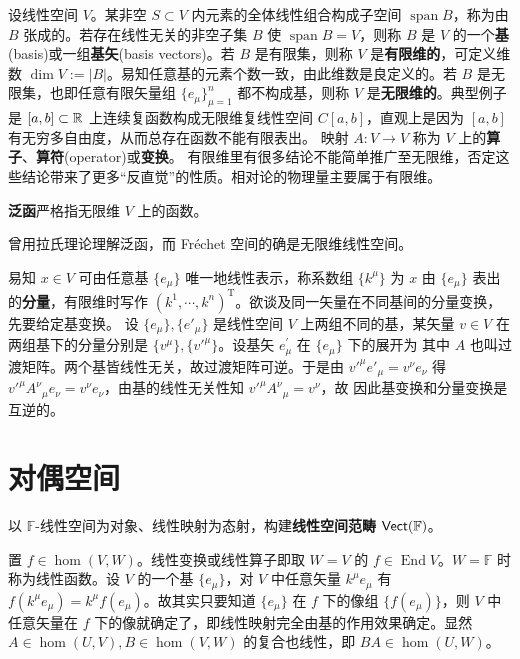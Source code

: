 设线性空间 $V$。某非空 $S\subset V$ 内元素的全体线性组合构成子空间 $\operatorname{span}B$，称为由 $B$ 张成的。若存在线性无关的非空子集 $B$ 使 $\operatorname{span}B=V$，则称 $B$ 是 $V$ 的一个\textbf{基}(basis)或一组\textbf{基矢}(basis vectors)。若 $B$ 是有限集，则称 $V$ 是\textbf{有限维的}，可定义维数 $\dim V:=|B|$。易知任意基的元素个数一致，由此维数是良定义的。若 $B$ 是无限集，也即任意有限矢量组 $\{e_\mu\}_{\mu=1}^n$ 都不构成基，则称 $V$ 是\textbf{无限维的}。典型例子是 $[a, b] \subset \mathbb{R}$ 上连续复函数构成无限维复线性空间 $C[a, b]$，直观上是因为 $[a, b]$ 有无穷多自由度，从而总存在函数不能有限表出。
映射 $A:V\to V$ 称为 $V$ 上的\textbf{算子}、\textbf{算符}(operator)或\textbf{变换}。
有限维里有很多结论不能简单推广至无限维，否定这些结论带来了更多“反直觉”的性质。相对论的物理量主要属于有限维。

\begin{definition}
    \textbf{泛函}严格指无限维 $V$ 上的函数。
\end{definition}

\begin{remark}
    曾用拉氏理论理解泛函，而 Fréchet 空间的确是无限维线性空间。
\end{remark}

易知 $x\in V$ 可由任意基 $\{e_\mu\}$ 唯一地线性表示，称系数组 $\{k^\mu\}$ 为 $x$ 由 $\{e_\mu\}$ 表出的\textbf{分量}，有限维时写作 $(k^1,\cdots,k^n)^\mathrm{T}$。欲谈及同一矢量在不同基间的分量变换，先要给定基变换。
设 $\{e_\mu\},\{e'_\mu\}$ 是线性空间 $V$ 上两组不同的基，某矢量 $v\in V$ 在两组基下的分量分别是 $\{v^\mu\},\{v'^\mu\}$。设基矢 $e_\mu^{\prime}$ 在 $\{e_\mu\}$ 下的展开为
其中 $A$ 也叫过渡矩阵。两个基皆线性无关，故过渡矩阵可逆。于是由 $v'^\mu e'_\mu=v^\nu e_\nu$ 得 $v'^\mu A^\nu{ }_\mu e_\nu=v^\nu e_\nu$，由基的线性无关性知 $v'^\mu A^\nu{ }_\mu =v^\nu$，故
因此基变换和分量变换是互逆的。

\section{对偶空间}

以 $\mathbb F$-线性空间为对象、线性映射为态射，构建\textbf{线性空间范畴} $\mathsf{Vect}(\mathbb F)$。

置 $f\in\hom(V,W)$。线性变换或线性算子即取 $W=V$ 的 $f\in\operatorname{End} V$。$W=\mathbb F$ 时称为线性函数。设 $V$ 的一个基 $\{e_\mu\}$，对 $V$ 中任意矢量 $k^\mu e_\mu$ 有 $f(k^\mu e_\mu)=k^\mu f(e_\mu)$。故其实只要知道 $\{e_\mu\}$ 在 $f$ 下的像组 $\{f(e_\mu)\}$，则 $V$ 中任意矢量在 $f$ 下的像就确定了，即线性映射完全由基的作用效果确定。显然 $A\in\hom(U,V),B\in\hom(V,W)$ 的复合也线性，即 $BA\in\hom(U,W)$。

